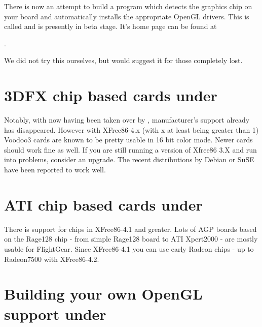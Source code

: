 There is now an attempt to build a program which detects the graphics chip on your board
and automatically installs the appropriate OpenGL drivers. This is called  and is presently in beta stage. It's home page can be found at
\medskip

.
\medskip

We did not try this ourselves, but would suggest it for those completely lost.

\section{3DFX chip based cards under \label{3dfxlinux}}

Notably, with  now having been taken over by , manufacturer's
support already has disappeared. However with XFree86-4.x (with x at least being greater
than 1) Voodoo3 cards are known to be pretty usable in 16 bit color mode. Newer cards
should work fine as well. If you are still running a version of Xfree86 3.X and run into
problems, consider an upgrade. The recent distributions by Debian or SuSE have been
reported to work well.

\section{ATI chip based cards under \label{atilinux}}

There is support for  chips in XFree86-4.1 and greater. Lots of
AGP boards based on the Rage128 chip - from simple Rage128 board to ATI
Xpert2000 - are mostly usable for FlightGear. Since XFree86-4.1 you can use
early Radeon chips - up to Radeon7500 with XFree86-4.2.

\section{Building your own OpenGL support under \label{ownopengl}}


